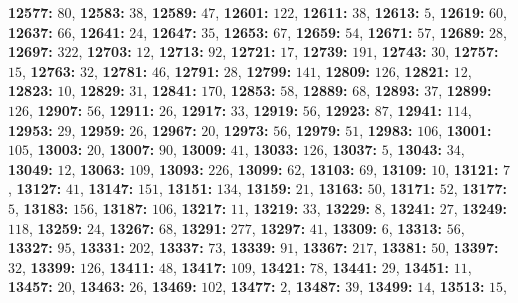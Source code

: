 \textsf{\bfseries 12577:} $80$, \textsf{\bfseries 12583:} $38$, \textsf{\bfseries 12589:} $47$, \textsf{\bfseries 12601:} $122$, \textsf{\bfseries 12611:} $38$, \textsf{\bfseries 12613:} $5$, \textsf{\bfseries 12619:} $60$, \textsf{\bfseries 12637:} $66$, \textsf{\bfseries 12641:} $24$, \textsf{\bfseries 12647:} $35$, \textsf{\bfseries 12653:} $67$, \textsf{\bfseries 12659:} $54$, \textsf{\bfseries 12671:} $57$, \textsf{\bfseries 12689:} $28$, \textsf{\bfseries 12697:} $322$, \textsf{\bfseries 12703:} $12$, \textsf{\bfseries 12713:} $92$, \textsf{\bfseries 12721:} $17$, \textsf{\bfseries 12739:} $191$, \textsf{\bfseries 12743:} $30$, \textsf{\bfseries 12757:} $15$, \textsf{\bfseries 12763:} $32$, \textsf{\bfseries 12781:} $46$, \textsf{\bfseries 12791:} $28$, \textsf{\bfseries 12799:} $141$, \textsf{\bfseries 12809:} $126$, \textsf{\bfseries 12821:} $12$, \textsf{\bfseries 12823:} $10$, \textsf{\bfseries 12829:} $31$, \textsf{\bfseries 12841:} $170$, \textsf{\bfseries 12853:} $58$, \textsf{\bfseries 12889:} $68$, \textsf{\bfseries 12893:} $37$, \textsf{\bfseries 12899:} $126$, \textsf{\bfseries 12907:} $56$, \textsf{\bfseries 12911:} $26$, \textsf{\bfseries 12917:} $33$, \textsf{\bfseries 12919:} $56$, \textsf{\bfseries 12923:} $87$, \textsf{\bfseries 12941:} $114$, \textsf{\bfseries 12953:} $29$, \textsf{\bfseries 12959:} $26$, \textsf{\bfseries 12967:} $20$, \textsf{\bfseries 12973:} $56$, \textsf{\bfseries 12979:} $51$, \textsf{\bfseries 12983:} $106$, \textsf{\bfseries 13001:} $105$, \textsf{\bfseries 13003:} $20$, \textsf{\bfseries 13007:} $90$, \textsf{\bfseries 13009:} $41$, \textsf{\bfseries 13033:} $126$, \textsf{\bfseries 13037:} $5$, \textsf{\bfseries 13043:} $34$, \textsf{\bfseries 13049:} $12$, \textsf{\bfseries 13063:} $109$, \textsf{\bfseries 13093:} $226$, \textsf{\bfseries 13099:} $62$, \textsf{\bfseries 13103:} $69$, \textsf{\bfseries 13109:} $10$, \textsf{\bfseries 13121:} $7$, \textsf{\bfseries 13127:} $41$, \textsf{\bfseries 13147:} $151$, \textsf{\bfseries 13151:} $134$, \textsf{\bfseries 13159:} $21$, \textsf{\bfseries 13163:} $50$, \textsf{\bfseries 13171:} $52$, \textsf{\bfseries 13177:} $5$, \textsf{\bfseries 13183:} $156$, \textsf{\bfseries 13187:} $106$, \textsf{\bfseries 13217:} $11$, \textsf{\bfseries 13219:} $33$, \textsf{\bfseries 13229:} $8$, \textsf{\bfseries 13241:} $27$, \textsf{\bfseries 13249:} $118$, \textsf{\bfseries 13259:} $24$, \textsf{\bfseries 13267:} $68$, \textsf{\bfseries 13291:} $277$, \textsf{\bfseries 13297:} $41$, \textsf{\bfseries 13309:} $6$, \textsf{\bfseries 13313:} $56$, \textsf{\bfseries 13327:} $95$, \textsf{\bfseries 13331:} $202$, \textsf{\bfseries 13337:} $73$, \textsf{\bfseries 13339:} $91$, \textsf{\bfseries 13367:} $217$, \textsf{\bfseries 13381:} $50$, \textsf{\bfseries 13397:} $32$, \textsf{\bfseries 13399:} $126$, \textsf{\bfseries 13411:} $48$, \textsf{\bfseries 13417:} $109$, \textsf{\bfseries 13421:} $78$, \textsf{\bfseries 13441:} $29$, \textsf{\bfseries 13451:} $11$, \textsf{\bfseries 13457:} $20$, \textsf{\bfseries 13463:} $26$, \textsf{\bfseries 13469:} $102$, \textsf{\bfseries 13477:} $2$, \textsf{\bfseries 13487:} $39$, \textsf{\bfseries 13499:} $14$, \textsf{\bfseries 13513:} $15$, 
